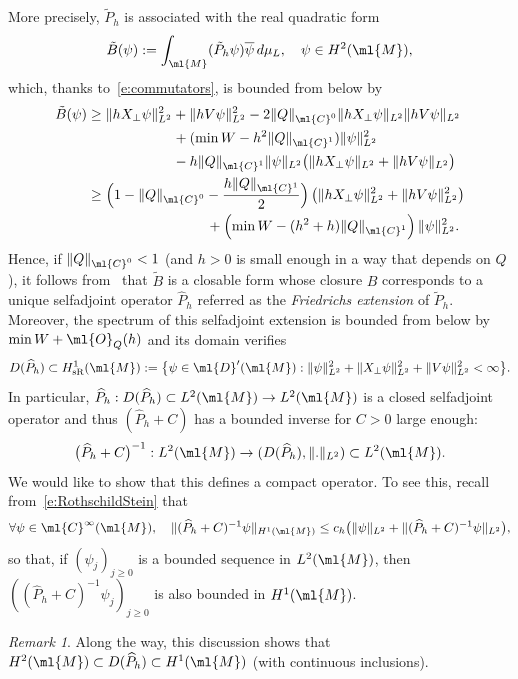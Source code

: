 \documentclass[10pt]{amsart}
\theoremstyle{plain}
\theoremstyle{definition}
\theoremstyle{remark}
\newtheorem{rema}[theo]{Remark}
\begin{document}
More precisely, $\tilde{P}_{h}$ is associated with the real quadratic form
\[
\tilde{B}(\psi):=\int_{\ml{M}}(\tilde{P}_h\psi)\overline{\psi} \, d\mu_L,\quad \psi\in H^2(\ml{M}),
\]
which, thanks to~\eqref{e:commutators}, is bounded from below by
\begin{align*}\tilde{B}(\psi) & \geq\|hX_\perp\psi\|^2_{L^2} +\|hV\psi\|^2_{L^2}-2\|Q\|_{\ml{C}^0}\|hX_\perp\psi\|_{L^2}\|hV\psi\|_{L^2} \\
& \hspace*{2.15cm} +(\min W-h^2\|Q\|_{\ml{C}^1})\|\psi\|^2_{L^2}\\
& \hspace*{2.15cm} -h\|Q\|_{\ml{C}^1}\|\psi\|_{L^2}\big(\|hX_\perp\psi\|_{L^2}+\|hV\psi\|_{L^2}\big)\\
& \geq \Bigl(1-\|Q\|_{\ml{C}^0}-\frac{h\|Q\|_{\ml{C}^1}}{2}\Bigr) \left(\|hX_\perp\psi\|^2_{L^2}+\|hV\psi\|^2_{L^2}\right)\\
& \hspace*{3cm} +\left(\min W-(h^2+h)\|Q\|_{\ml{C}^1}\right)\|\psi\|^2_{L^2}.
\end{align*}
Hence, if $\|Q\|_{\ml{C}^0}<1$ (and $h>0$ is small enough in a way that depends on $Q$), it follows from~\cite[Th.\,X.23]{ReedSimon75} that $\tilde{B}$ is a closable form whose closure $B$ corresponds to a unique selfadjoint operator $\widehat{P}_h$ referred as the \emph{Friedrichs extension} of $\tilde{P}_h$. Moreover, the spectrum of this selfadjoint extension is bounded from below by $\min W+\ml{O}_Q(h)$ and its domain verifies
\[
D(\widehat{P}_h)\subset H^1_{\text{sR}}(\ml{M}):=\bigl\{\psi\in\ml{D}'(\ml{M}): \|\psi\|_{L^2}^2+\|X_\perp\psi\|_{L^2}^2+\|V\psi\|^2_{L^2}<\infty\bigr\}.
\]
In particular, $\widehat{P}_h:D(\widehat{P}_h)\subset L^2(\ml{M})\to L^2(\ml{M})$ is a closed selfadjoint operator and thus $(\widehat{P}_h+C)$ has a bounded inverse for $C>0$ large enough:
\[
\big(\widehat{P}_h+C\big)^{-1}:L^2(\ml{M})\to (D(\widehat{P}_h),\|.\|_{L^2})\subset L^2(\ml{M}).
\]
We would like to show that this defines a compact operator. To see this, recall from~\eqref{e:RothschildStein} that
\[
\forall\psi\in\ml{C}^{\infty}(\ml{M}),\quad \|(\widehat{P}_h+C)^{-1}\psi\|_{H^1(\ml{M})}\leq c_h\big(\|\psi\|_{L^2}+\|(\widehat{P}_h+C)^{-1}\psi\|_{L^2}\big),
\]
so that, if $(\psi_j)_{j\geq 0}$ is a bounded sequence in $L^2(\ml{M})$, then $((\widehat{P}_h+C)^{-1}\psi_j)_{j\geq 0}$ is also bounded in $H^1(\ml{M})$.
\begin{rema}\label{r:domain} Along the way, this discussion shows that $H^2(\ml{M})\subset D(\widehat{P}_h)\subset H^1(\ml{M})$ (with continuous inclusions).
\end{rema}
\end{document}
